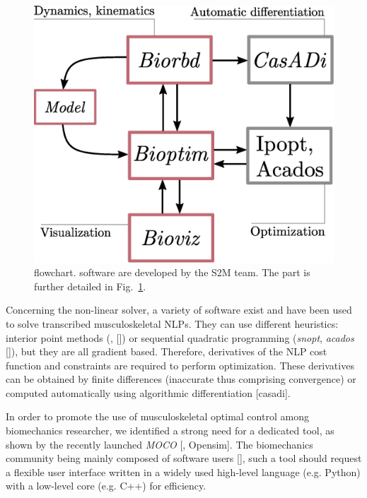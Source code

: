 \begin{figure}[t!]
\centering
\includegraphics[width=0.9\columnwidth]{figures/dependencies.eps}
\caption{\bioptim {} flowchart.  software are developed by the S2M team. The \bioptim part is further detailed in Fig.~\ref{fig:dependencies}.}
\label{fig:dependencies}
\vspace*{-0.5cm}
\end{figure}

Concerning the non-linear solver, a variety of software exist and have been used to solve transcribed musculoskeletal NLPs.
They can use different heuristics: interior point methods (\textit{}, [\addref]) or sequential quadratic programming (\textit{snopt}, \textit{acados} [\addref]), but they are all gradient based.
Therefore, derivatives of the NLP cost function and constraints are required to perform optimization.
These derivatives can be obtained by finite differences (inaccurate thus comprising convergence) or computed automatically using algorithmic differentiation [casadi].


In order to promote the use of musculoskeletal optimal control among biomechanics researcher, we identified a strong need for a dedicated tool, as shown by the recently launched \textit{MOCO} [\addref, Opensim]. 
The biomechanics community being mainly composed of software users [\addref], such a tool should request a flexible user interface written in a widely used high-level language (e.g. Python) with a low-level core (e.g. C++) for efficiency. 


